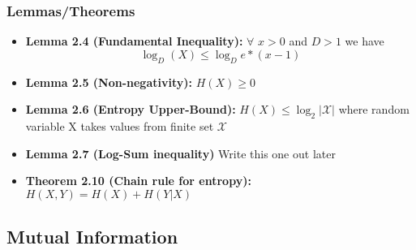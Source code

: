 \documentclass{article}
\begin{document}
\subsubsection{Lemmas/Theorems}
\begin{flushleft}
    \begin{itemize}
        \item \textbf{Lemma 2.4 (Fundamental Inequality):} \(\forall\) \(x>0\) and \(D > 1\) we have \[\log_{D}{(X)} \leq \log_{D}{e}*(x-1) \]

        \item \textbf{Lemma 2.5 (Non-negativity):} \(H(X) \geq 0\)
    
        \item \textbf{Lemma 2.6 (Entropy Upper-Bound):} \(H(X) \leq \log_{2}{|\mathcal{X}|} \) where random variable X takes values from finite set \(\mathcal{X}\)
    
        \item \textbf{Lemma 2.7 (Log-Sum inequality)} Write this one out later 
        \item \textbf{Theorem 2.10 (Chain rule for entropy): } \( H(X,Y) = H(X) + H(Y|X)\)

    \end{itemize}
\end{flushleft}

\subsection{Mutual Information}
\end{document}
